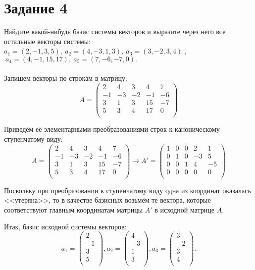 \documentclass[a4paper,12pt]{article}
\begin{document}
\section*{Задание 4}
Найдите какой-нибудь базис системы векторов и выразите через него все остальные векторы системы:\\
$a_1 = (2, -1, 3, 5), \ a_2 = (4, -3, 1, 3), \ a_3 = (3, -2, 3, 4)$ ,\\
$ \ a_4 = (4, -1, 15, 17), \ a_5 = (7, -6, -7, 0).$ \\
\\
Запишем векторы по строкам в матрицу:
$$A=\begin{pmatrix}
2 & 4 & 3 & 4 & 7\\
-1 & -3 & -2 & -1 & -6\\
3 & 1 & 3 & 15 & -7\\
5 & 3 & 4 & 17 &0 \\
\end{pmatrix}$$ \par
Приведём её элементарными преобразованиями строк к каноническому ступенчатому виду:
$$A=\begin{pmatrix}
2 & 4 & 3 & 4 & 7\\
-1 & -3 & -2 & -1 & -6\\
3 & 1 & 3 & 15 & -7\\
5 & 3 & 4 & 17 &0 \\
\end{pmatrix}
\longrightarrow A'=
\begin{pmatrix}
1 & 0 & 0 & 2 & 1\\
0 & 1 & 0 & -3 & 5\\
0 & 0 & 1 & 4 & -5\\
0 & 0 & 0 & 0 &0 \\
\end{pmatrix}
$$
\par
Поскольку при преобразовании к ступенчатому виду одна из координат оказалась <<утеряна>>, то в качестве базисных возьмём те вектора, которые соответствуют главным координатам матрицы $A'$ в исходной матрице $A$. \par
Итак, базис исходной системы векторов: 
$$a_1 =
\begin{pmatrix}
2 \\
-1 \\
3 \\
5 \\
\end{pmatrix},
a_2 = 
\begin{pmatrix}
4 \\
-3 \\
1 \\
3 \\
\end{pmatrix},
a_3 = 
\begin{pmatrix}
3 \\
-2 \\
3 \\
4 \\
\end{pmatrix}.$$
\end{document}
